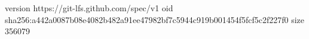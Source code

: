 version https://git-lfs.github.com/spec/v1
oid sha256:a442a0087b08e4082b482a91ee47982bf7c5944c919b001454f5fcf5c2f227f0
size 356079
